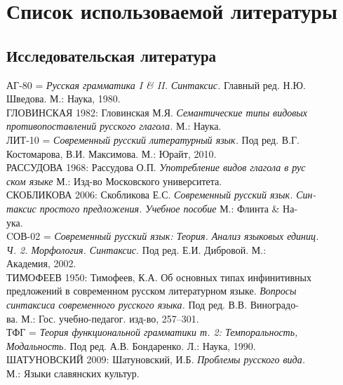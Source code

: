 \newcommand{\indenttext}{\hspace*{4ex}}
\newcommand{\cutline}{\\\indenttext}
\newcommand{\cutword}{-\cutline}

\section*{Список использоваемой литературы}
\setlength{\parindent}{0cm}
\begin{normalsize}
\subsection*{Исследовательская литература}
АГ-80 = \textit{Русская грамматика I \& II. Синтаксис.} Главный ред. Н.Ю.\cutline Шведова. М.: Наука, 1980.\\
ГЛОВИНСКАЯ 1982: Гловинская М.Я. \textit{Семантические типы видовых\cutline противопоставлений русского глагола.} М.: Наука.\\
ЛИТ-10 = \textit{Современный русский литературный язык.} Под ред. В.Г.\cutline Костомарова, В.И. Максимова. М.: Юрайт, 2010.\\
РАССУДОВА 1968: Рассудова О.П. \textit{Употребление видов глагола в рус\cutline ском языке} М.: Изд-во Московского университета.\\
СКОБЛИКОВА 2006: Скобликова Е.С. \textit{Современный русский язык. Син\cutword таксис простого предложения. Учебное пособие} М.: Флинта \& На\cutword ука.\\
CОВ-02 = \textit{Современный русский язык: Теория. Анализ языковых единиц.\cutline Ч. 2. Морфология. Синтаксис.} Под ред. Е.И. Дибровой. М.:\cutline Академия, 2002.\\
ТИМОФЕЕВ 1950: Тимофеев, К.А. Об основных типах инфинитивных \indenttext предложений в современном русском литературном языке. \textit{Вопросы \cutline синтаксиса современного русского языка.} Под ред. В.В. Виноградо\cutword ва. М.: Гос. учебно-педагог. изд-во, 257--301.\\
ТФГ = \textit{Теория функциональной грамматики т. 2: Темпоральность, \cutline Модальность.} Под ред. А.В. Бондаренко. Л.: Наука, 1990.\\
ШАТУНОВСКИЙ 2009: Шатуновский, И.Б. \textit{Проблемы русского вида.} \cutline М.: Языки славянских культур.
\end{normalsize}